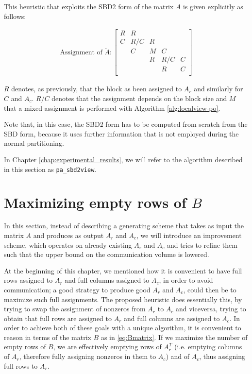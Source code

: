 This heuristic that exploits the SBD2 form of the matrix $A$ is given explicitly as follows:

\begin{align}
	\text{Assignment of } \ddot{A}: \begin{bmatrix}
		R & R & & & \\
		C & R/C & R & & \\
		& C & M & C & \\
		& & R & R/C & C \\
		& & & R & C \\
	\end{bmatrix}
	\label{eq:sbd2view}
\end{align}

$R$ denotes, as previously, that the block as been assigned to $A_r$ and similarly for $C$ and $A_c$. $R/C$ denotes that the assignment depends on the block size and $M$ that a mixed assignment is performed with Algorithm \ref{alg:localview-po}.

Note that, in this case, the SBD2 form has to be computed from scratch from the SBD form, because it uses further information that is not employed during the normal partitioning.

In Chapter \ref{chap:experimental_results}, we will refer to the algorithm described in this section as \verb|pa_sbd2view|.

\section{Maximizing empty rows of $B$} \label{sec:globalview}

In this section, instead of describing a generating scheme that takes as input the matrix $A$ and produces as output $A_r$ and $A_c$, we will introduce an improvement scheme, which operates on already existing $A_r$ and $A_c$ and tries to refine them such that the upper bound on the communication volume is lowered.

At the beginning of this chapter, we mentioned how it is convenient to have full rows assigned to $A_r$ and full columns assigned to $A_c$, in order to avoid communication; a good strategy to produce good $A_r$ and $A_c$, could then be to maximize such full assignments. The proposed heuristic does essentially this, by trying to swap the assignment of nonzeros from $A_r$ to $A_c$ and viceversa, trying to obtain that full rows are assigned to $A_r$ and full columns are assigned to $A_c$. In order to achieve both of these goals with a unique algorithm, it is convenient to reason in terms of the matrix $B$ as in \eqref{eq:Bmatrix}. If we maximize the number of empty rows of $B$, we are effectively emptying rows of $A_r^T$ (i.e. emptying columns of $A_r$, therefore fully assigning nonzeros in them to $A_c$) and of $A_c$, thus assigning full rows to $A_r$.

